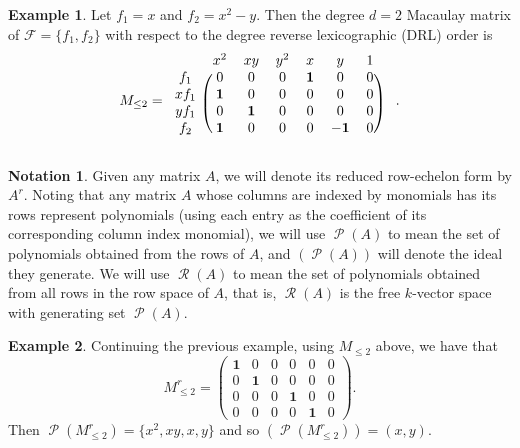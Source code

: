 \documentclass[11pt]{article}
\newcommand{\F}{\mathcal{F}}
\DeclareMathOperator{\Poly}{\mathscr{P}}
\DeclareMathOperator{\Row}{\mathscr{R}}
\theoremstyle{definition}
\newtheorem{example}{Example}
\newtheorem*{notation}{Notation}
\begin{document}
\begin{example}
	Let $f_1 = x$ and $f_2 = x^2 - y$. Then the degree $d = 2$ Macaulay matrix of $\F = \{f_1, f_2\}$ with respect to the degree reverse lexicographic (DRL) order is \[ M_{\leq 2} = \begin{blockarray}{ccccccc}
    & x^2 & xy & y^2 & x & y & 1 \\
    \begin{block}{c(cccccc)}
        f_1 & 0 & 0 & 0 & \mathbf{1} & 0 & 0 \\
        xf_1 & \mathbf{1} & 0 & 0 & 0 & 0 & 0 \\
        yf_1 & 0 & \mathbf{1} & 0 & 0 & 0 & 0 \\
        f_2 & \mathbf{1} & 0 & 0 & 0 & \mathbf{-1} & 0 \\
    \end{block}
\end{blockarray} \quad . \]
\end{example}


\begin{notation}
	Given any matrix $A$, we will denote its reduced row-echelon form by $A^r$. Noting that any matrix $A$ whose columns are indexed by monomials has its rows represent polynomials (using each entry as the coefficient of its corresponding column index monomial), we will use $\Poly(A)$ to mean the set of polynomials obtained from the rows of $A$, and $(\Poly(A))$ will denote the ideal they generate. We will use $\Row(A)$ to mean the set of polynomials obtained from all rows in the row space of $A$, that is, $\Row(A)$ is the free $k$-vector space with generating set $\Poly(A)$.  
\end{notation}


\begin{example}
	Continuing the previous example, using $M_{\leq 2}$ above, we have that \[ M_{\leq 2}^r = \begin{pmatrix}
		\mathbf{1} & 0 & 0 & 0 & 0 & 0 \\
		0 & \mathbf{1} & 0 & 0 & 0 & 0 \\
		0 & 0 & 0 & \mathbf{1} & 0 & 0 \\
		0 & 0 & 0 & 0 & \mathbf{1} & 0
	\end{pmatrix}. \] Then $\Poly(M_{\leq 2}^r) = \{x^2, xy, x, y\}$ and so $(\Poly(M_{\leq 2}^r)) = (x,y)$.
\end{example}
\end{document}
